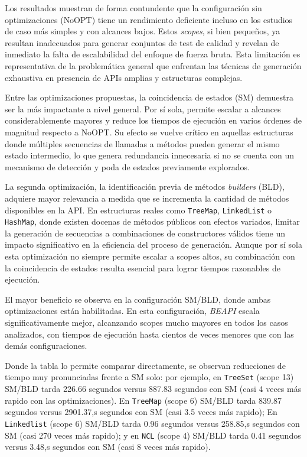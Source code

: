 Los resultados muestran de forma contundente que la configuración sin optimizaciones (\textsf{NoOPT}) 
tiene un rendimiento deficiente incluso en los estudios de caso más simples y con alcances bajos. 
Estos \emph{scopes}, si bien pequeños, ya resultan inadecuados para generar conjuntos de test de 
calidad y revelan de inmediato la falta de escalabilidad del enfoque de fuerza bruta. Esta limitación 
es representativa de la problemática general que enfrentan las técnicas de generación exhaustiva en 
presencia de APIs amplias y estructuras complejas.

Entre las optimizaciones propuestas, la coincidencia de estados (\textsf{SM}) demuestra ser la más 
impactante a nivel general. Por sí sola, permite escalar a alcances considerablemente mayores y reduce 
los tiempos de ejecución en varios órdenes de magnitud respecto a \textsf{NoOPT}. Su efecto se vuelve 
crítico en aquellas estructuras donde múltiples secuencias de llamadas a métodos pueden generar el mismo estado 
intermedio, lo que genera redundancia innecesaria si no se cuenta con un mecanismo de detección y poda 
de estados previamente explorados.

La segunda optimización, la identificación previa de métodos \emph{builders} (\textsf{BLD}), adquiere 
mayor relevancia a medida que se incrementa la cantidad de métodos disponibles en la API. En 
estructuras reales como \texttt{TreeMap}, \texttt{LinkedList} o \texttt{HashMap}, donde existen 
docenas de métodos públicos con efectos variados, limitar la generación de secuencias a combinaciones 
de constructores válidos tiene un impacto significativo en la eficiencia del proceso de generación. 
Aunque por sí sola esta optimización no siempre permite escalar a scopes altos, su combinación con la 
coincidencia de estados resulta esencial para lograr tiempos razonables de ejecución.

El mayor beneficio se observa en la configuración \textsf{SM/BLD}, donde ambas optimizaciones están 
habilitadas. En esta configuración, \emph{BEAPI} escala significativamente mejor, alcanzando scopes 
mucho mayores en todos los casos analizados, con tiempos de ejecución hasta cientos de veces menores 
que con las demás configuraciones.

Donde la tabla lo permite comparar directamente, se observan reducciones de tiempo muy pronunciadas frente a \textsf{SM} solo: 
por ejemplo, en \texttt{TreeSet} (scope 13) \textsf{SM/BLD} tarda 226.66 segundos versus 887.83 segundos con \textsf{SM}  (casi 4 veces más rapido con las optimizaciones).
En \texttt{TreeMap} (scope 6) \textsf{SM/BLD} tarda 839.87 segundos versus 2901.37,s segundos con \textsf{SM} (casi 3.5 veces más rapido);
En \texttt{Linkedlist} (scope 6) \textsf{SM/BLD} tarda 0.96 segundos versus 258.85,s segundos con \textsf{SM} (casi 270 veces más rapido); y en 
\texttt{NCL} (scope 4) \textsf{SM/BLD} tarda 0.41 segundos versus 3.48,s segundos con \textsf{SM} (casi 8 veces más rapido).



